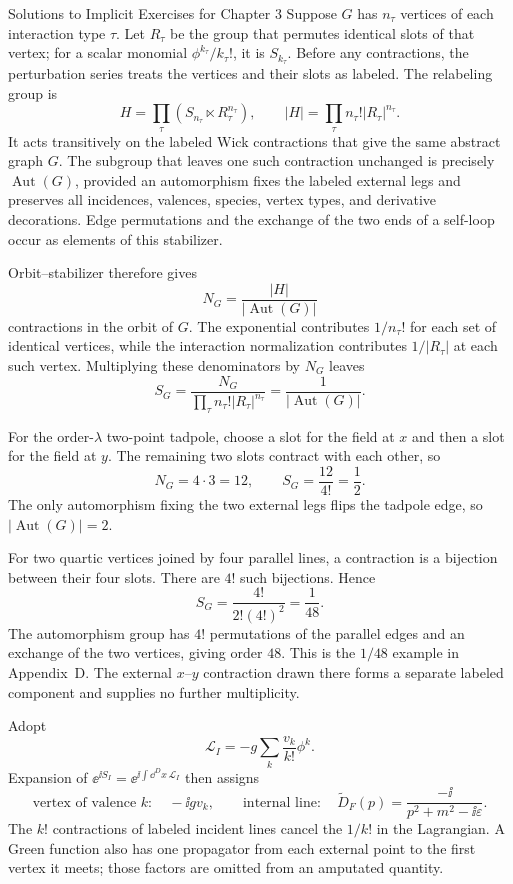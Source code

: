 \begin{bankssolutions}{Solutions to Implicit Exercises for Chapter 3}
Suppose $G$ has $n_\tau$ vertices of each interaction type $\tau$.  Let
$R_\tau$ be the group that permutes identical slots of that vertex; for a
scalar monomial $\phi^{k_\tau}/k_\tau!$, it is $S_{k_\tau}$.  Before any
contractions, the perturbation series treats the vertices and their slots as
labeled.  The relabeling group is
\[
 H=\prod_\tau\left(S_{n_\tau}\ltimes R_\tau^{n_\tau}\right),
 \qquad |H|=\prod_\tau n_\tau!|R_\tau|^{n_\tau}.
\]
It acts transitively on the labeled Wick contractions that give the same
abstract graph $G$.  The subgroup that leaves one such contraction unchanged
is precisely $\operatorname{Aut}(G)$, provided an automorphism fixes the
labeled external legs and preserves all incidences, valences, species, vertex
types, and derivative decorations.  Edge
permutations and the exchange of the two ends of a self-loop occur as elements
of this stabilizer.

Orbit--stabilizer therefore gives
\[
 N_G=\frac{|H|}{{|\operatorname{Aut}(G)|}}
\]
contractions in the orbit of $G$.  The exponential contributes $1/n_\tau!$
for each set of identical vertices, while the interaction normalization
contributes $1/|R_\tau|$ at each such vertex.  Multiplying these denominators
by $N_G$ leaves
\[
 \boxed{S_G=\frac{N_G}
 {\prod_\tau n_\tau!|R_\tau|^{n_\tau}}
 =\frac{1}{|\operatorname{Aut}(G)|}}.
\]

For the order-$\lambda$ two-point tadpole, choose a slot for the field at $x$
and then a slot for the field at $y$.  The remaining two slots contract with
each other, so
\[
 N_G=4\cdot3=12,
 \qquad S_G=\frac{12}{4!}=\frac12.
\]
The only automorphism fixing the two external legs flips the tadpole edge, so
$|\operatorname{Aut}(G)|=2$.

For two quartic vertices joined by four parallel lines, a contraction is a
bijection between their four slots.  There are $4!$ such bijections.  Hence
\[
 S_G=\frac{4!}{2!(4!)^2}=\frac1{48}.
\]
The automorphism group has $4!$ permutations of the parallel edges and an
exchange of the two vertices, giving order $48$.  This is the $1/48$ example
in Appendix~D.  The external $x$--$y$ contraction drawn there forms a separate
labeled component and supplies no further multiplicity.

Adopt
\[
 \mathcal L_I=-g\sum_k\frac{v_k}{k!}\phi^k.
\]
Expansion of $\ee^{\ii S_I}=\ee^{\ii\int\dd^D x\,\mathcal L_I}$ then assigns
\[
 \text{vertex of valence }k:\quad -\ii g v_k,
 \qquad
 \text{internal line}:\quad
 \widetilde D_F(p)=\frac{-\ii}{p^2+m^2-\ii\varepsilon}.
\]
The $k!$ contractions of labeled incident lines cancel the $1/k!$ in the
Lagrangian.  A Green function also has one propagator from each external point
to the first vertex it meets; those factors are omitted from an amputated
quantity.


\end{bankssolutions}

